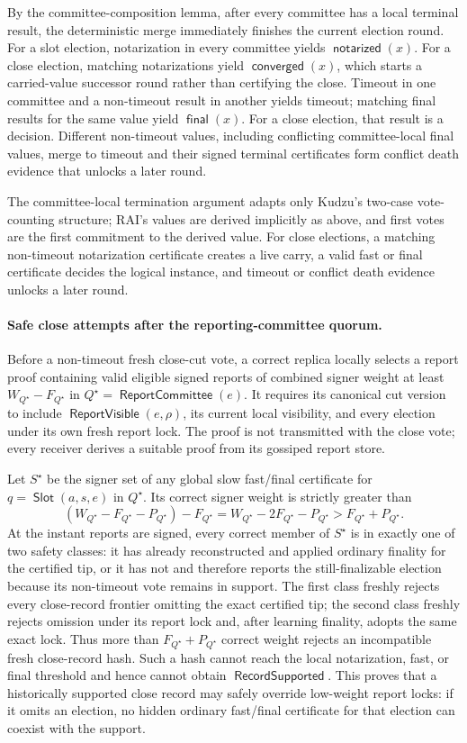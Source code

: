 \documentclass[sigplan,twocolumn,review,anonymous]{acmart}
\newcommand{\func}[1]{\operatorname{\mathsf{#1}}}
\newcommand{\Slot}{\func{Slot}}
\newcommand{\ReportCommittee}{\func{ReportCommittee}}
\newcommand{\notarized}{\func{notarized}}
\newcommand{\converged}{\func{converged}}
\newcommand{\final}{\func{final}}
\newcommand{\RecordSupported}{\func{RecordSupported}}
\newcommand{\ReportVisible}{\func{ReportVisible}}
\begin{document}
By the committee-composition lemma, after every committee has a local terminal result, the
deterministic merge immediately finishes the current election round.  For a slot election, notarization
in every committee yields \(\notarized(x)\).  For a close election, matching notarizations yield
\(\converged(x)\), which starts a carried-value successor round rather than certifying the close.
Timeout in one committee and a non-timeout result in another yields timeout; matching final results for
the same value yield \(\final(x)\).  For a close election, that result is a decision.  Different
non-timeout values, including conflicting committee-local final values, merge to timeout and their
signed terminal certificates form conflict death evidence that unlocks a later round.

The committee-local termination argument adapts only Kudzu's two-case vote-counting structure; RAI's
values are derived implicitly as above, and first votes are the first commitment to the derived value.
For close elections, a matching non-timeout notarization certificate creates a live carry, a valid fast
or final certificate decides the logical instance, and timeout or conflict death evidence unlocks a
later round.

\paragraph{Safe close attempts after the reporting-committee quorum.}
Before a non-timeout fresh close-cut vote, a correct replica locally selects a report proof containing
valid eligible signed reports of combined signer weight at least \(W_{Q^\star}-F_{Q^\star}\) in
\(Q^\star=\ReportCommittee(e)\).  It requires its canonical cut version to include
\(\ReportVisible(e,\rho)\), its current local visibility, and every election under its own fresh report
lock.  The proof is not transmitted with the close vote; every receiver derives a suitable proof from
its gossiped report store.

Let \(S^\star\) be the signer set of any global slow fast/final certificate for
\(q=\Slot(a,s,e)\) in \(Q^\star\).  Its correct signer weight is strictly greater than
\[
(W_{Q^\star}-F_{Q^\star}-P_{Q^\star})-F_{Q^\star}
= W_{Q^\star}-2F_{Q^\star}-P_{Q^\star}
>F_{Q^\star}+P_{Q^\star}.
\]
At the instant reports are signed, every correct member of \(S^\star\) is in exactly one of two safety
classes: it has already reconstructed and applied ordinary finality for the certified tip, or it has not
and therefore reports the still-finalizable election because its non-timeout vote remains in support.
The first class freshly rejects every close-record frontier omitting the exact certified tip; the second
class freshly rejects omission under its report lock and, after learning finality, adopts the same exact
lock.  Thus more than \(F_{Q^\star}+P_{Q^\star}\) correct weight rejects an incompatible fresh
close-record hash.  Such a hash cannot reach the local notarization, fast, or final threshold and hence
cannot obtain \(\RecordSupported\).  This proves that a historically supported close record may safely
override low-weight report locks: if it omits an election, no hidden ordinary fast/final certificate for
that election can coexist with the support.
\end{document}
